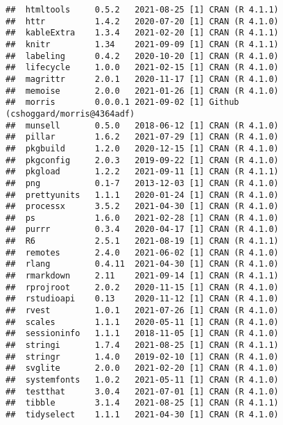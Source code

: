 \documentclass[
  12pt,
]{article}
\begin{document}
\begin{verbatim}
##  htmltools     0.5.2   2021-08-25 [1] CRAN (R 4.1.1)                   
##  httr          1.4.2   2020-07-20 [1] CRAN (R 4.1.0)                   
##  kableExtra    1.3.4   2021-02-20 [1] CRAN (R 4.1.1)                   
##  knitr         1.34    2021-09-09 [1] CRAN (R 4.1.1)                   
##  labeling      0.4.2   2020-10-20 [1] CRAN (R 4.1.0)                   
##  lifecycle     1.0.0   2021-02-15 [1] CRAN (R 4.1.0)                   
##  magrittr      2.0.1   2020-11-17 [1] CRAN (R 4.1.0)                   
##  memoise       2.0.0   2021-01-26 [1] CRAN (R 4.1.0)                   
##  morris        0.0.0.1 2021-09-02 [1] Github (cshoggard/morris@4364adf)
##  munsell       0.5.0   2018-06-12 [1] CRAN (R 4.1.0)                   
##  pillar        1.6.2   2021-07-29 [1] CRAN (R 4.1.0)                   
##  pkgbuild      1.2.0   2020-12-15 [1] CRAN (R 4.1.0)                   
##  pkgconfig     2.0.3   2019-09-22 [1] CRAN (R 4.1.0)                   
##  pkgload       1.2.2   2021-09-11 [1] CRAN (R 4.1.1)                   
##  png           0.1-7   2013-12-03 [1] CRAN (R 4.1.0)                   
##  prettyunits   1.1.1   2020-01-24 [1] CRAN (R 4.1.0)                   
##  processx      3.5.2   2021-04-30 [1] CRAN (R 4.1.0)                   
##  ps            1.6.0   2021-02-28 [1] CRAN (R 4.1.0)                   
##  purrr         0.3.4   2020-04-17 [1] CRAN (R 4.1.0)                   
##  R6            2.5.1   2021-08-19 [1] CRAN (R 4.1.1)                   
##  remotes       2.4.0   2021-06-02 [1] CRAN (R 4.1.0)                   
##  rlang         0.4.11  2021-04-30 [1] CRAN (R 4.1.0)                   
##  rmarkdown     2.11    2021-09-14 [1] CRAN (R 4.1.1)                   
##  rprojroot     2.0.2   2020-11-15 [1] CRAN (R 4.1.0)                   
##  rstudioapi    0.13    2020-11-12 [1] CRAN (R 4.1.0)                   
##  rvest         1.0.1   2021-07-26 [1] CRAN (R 4.1.0)                   
##  scales        1.1.1   2020-05-11 [1] CRAN (R 4.1.0)                   
##  sessioninfo   1.1.1   2018-11-05 [1] CRAN (R 4.1.0)                   
##  stringi       1.7.4   2021-08-25 [1] CRAN (R 4.1.1)                   
##  stringr       1.4.0   2019-02-10 [1] CRAN (R 4.1.0)                   
##  svglite       2.0.0   2021-02-20 [1] CRAN (R 4.1.0)                   
##  systemfonts   1.0.2   2021-05-11 [1] CRAN (R 4.1.0)                   
##  testthat      3.0.4   2021-07-01 [1] CRAN (R 4.1.0)                   
##  tibble        3.1.4   2021-08-25 [1] CRAN (R 4.1.1)                   
##  tidyselect    1.1.1   2021-04-30 [1] CRAN (R 4.1.0)                   

\end{verbatim}
\end{document}
